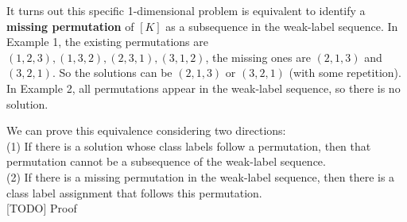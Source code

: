 \documentclass{article}
\newcommand{\calS}{{\mathcal{S}}}
\newcommand{\calC}{\mathcal{C}}
\begin{document}
It turns out this specific 1-dimensional problem is equivalent to identify a \textbf{missing permutation} of $[K]$ as a subsequence in the weak-label sequence. In Example 1, the existing permutations are $(1,2,3), (1,3,2), (2,3,1), (3,1,2)$, the missing ones are $(2,1,3)$ and $(3,2,1)$.  So the solutions can be $(2,1,3)$ or $(3,2,1)$ (with some repetition). In Example 2, all permutations appear in the weak-label sequence, so there is no solution. 

We can prove this equivalence considering two directions: \\
(1) If there is a solution whose class labels follow a permutation, then that permutation cannot be a subsequence of the weak-label sequence. \\
(2) If there is a missing permutation in the weak-label sequence, then there is a class label assignment that follows this permutation.\\ 
{\color{red} [TODO] Proof}

\end{document}
